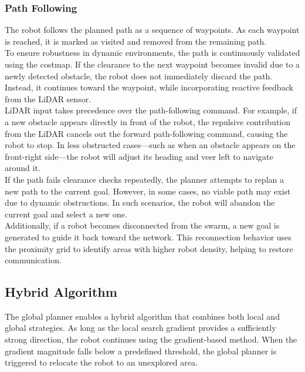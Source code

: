 \subsubsection{Path Following}
\label{sec:path_following}
The robot follows the planned path as a sequence of waypoints. As each waypoint is reached, it is marked as visited and removed from the remaining path. \\

To ensure robustness in dynamic environments, the path is continuously validated using the costmap. If the clearance to the next waypoint becomes invalid due to a newly detected obstacle, the robot does not immediately discard the path. Instead, it continues toward the waypoint, while incorporating reactive feedback from the LiDAR sensor. \\

LiDAR input takes precedence over the path-following command. For example, if a new obstacle appears directly in front of the robot, the repulsive contribution from the LiDAR cancels out the forward path-following command, causing the robot to stop. In less obstructed cases—such as when an obstacle appears on the front-right side—the robot will adjust its heading and veer left to navigate around it. \\

If the path fails clearance checks repeatedly, the planner attempts to replan a new path to the current goal. However, in some cases, no viable path may exist due to dynamic obstructions. In such scenarios, the robot will abandon the current goal and select a new one. \\

Additionally, if a robot becomes disconnected from the swarm, a new goal is generated to guide it back toward the network. This reconnection behavior uses the proximity grid to identify areas with higher robot density, helping to restore communication.

\subsection{Hybrid Algorithm}
The global planner enables a hybrid algorithm that combines both local and global strategies. As long as the local search gradient provides a sufficiently strong direction, the robot continues using the gradient-based method. When the gradient magnitude falls below a predefined threshold, the global planner is triggered to relocate the robot to an unexplored area.

